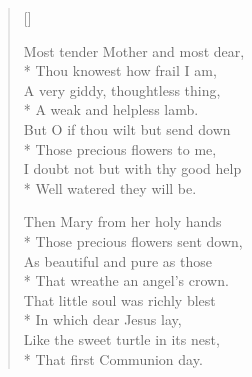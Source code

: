 \begin{verse}[\versewidth]
 \begin{altverse}
  Most tender Mother and most dear,\\*
Thou knowest how frail I am,\\
A very giddy, thoughtless thing,\\*
A weak and helpless lamb.\\
But O if thou wilt but send down\\*
Those precious flowers to me,\\
I doubt not but with thy good help\\*
Well watered they will be.
\end{altverse}
 
 \begin{altverse}
 Then Mary from her holy hands\\*
Those precious flowers sent down,\\
As beautiful and pure as those\\*
That wreathe an angel's crown.\\
That little soul was richly blest\\*
In which dear Jesus lay,\\
Like the sweet turtle in its nest,\\*
That first Communion day.
\end{altverse}

\end{verse}




